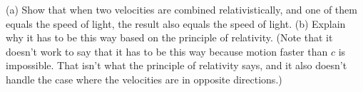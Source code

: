 (a) Show that when two velocities are combined
relativistically, and one of them equals the speed of light,
the result also equals the speed of light. \hwendpart
(b) Explain why
it has to be this way based on the principle of relativity.
(Note that it doesn't work to say that it has to be this way
because motion faster than $c$ is impossible. That isn't what
the principle of relativity says, and it also doesn't handle
the case where the velocities are in opposite directions.)

